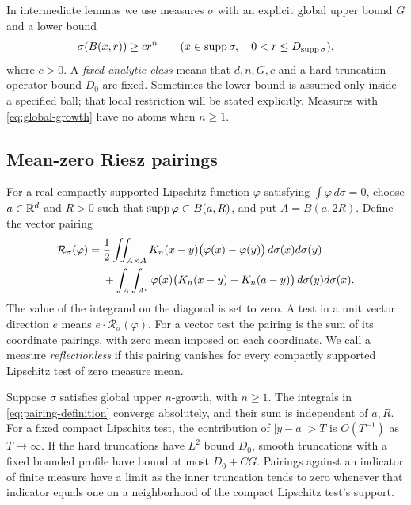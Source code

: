In intermediate lemmas we use measures $\sigma$ with an explicit
global upper bound $G$ and a lower bound
\begin{equation}\label{eq:lower-growth}
 \sigma(B(x,r))\ge c r^n
 \qquad(x\in\operatorname{supp}\sigma,\quad 0<r\le D_{\operatorname{supp}\sigma}),
\end{equation}
where $c>0$. A \emph{fixed analytic class} means that
$d,n,G,c$ and a hard-truncation operator bound $D_0$ are fixed.
Sometimes the lower bound is assumed only inside a specified ball;
that local restriction will be stated explicitly. Measures with
\eqref{eq:global-growth} have no atoms when $n\ge1$.

\subsection{Mean-zero Riesz pairings}

For a real compactly supported Lipschitz function $\varphi$ satisfying
$\int\varphi\,d\sigma=0$, choose $a\in\mathbb R^d$ and $R>0$ such that
$\operatorname{supp}\varphi\subset B(a,R)$, and put $A=B(a,2R)$. Define the vector
pairing
\begin{align}
 \mathcal R_\sigma(\varphi)
 ={}&\frac12\iint_{A\times A}
 K_n(x-y)\bigl(\varphi(x)-\varphi(y)\bigr)
 \,d\sigma(x)d\sigma(y)\notag\\
 &+\int_A\int_{A^c}\varphi(x)
 \bigl(K_n(x-y)-K_n(a-y)\bigr)\,d\sigma(y)d\sigma(x).
 \label{eq:pairing-definition}
\end{align}
The value of the integrand on the diagonal is set to zero. A test in
a unit vector direction $e$ means $e\cdot\mathcal R_\sigma(\varphi)$.
For a vector test the pairing is the sum of its coordinate pairings,
with zero mean imposed on each coordinate. We call a measure
\emph{reflectionless} if this pairing vanishes for every compactly
supported Lipschitz test of zero measure mean.

\begin{lemma}\label{lem:pairings}
Suppose $\sigma$ satisfies global upper $n$-growth, with $n\ge1$.
The integrals in \eqref{eq:pairing-definition} converge absolutely,
and their sum is independent of $a,R$. For a fixed compact Lipschitz
test, the contribution of $|y-a|>T$ is $O(T^{-1})$ as $T\to\infty$.
If the hard truncations have $L^2$ bound $D_0$, smooth truncations with
a fixed bounded profile have bound at most $D_0+CG$. Pairings against
an indicator of finite measure have a limit as the inner truncation
tends to zero whenever that indicator equals one on a neighborhood of
the compact Lipschitz test's support.
\end{lemma}

